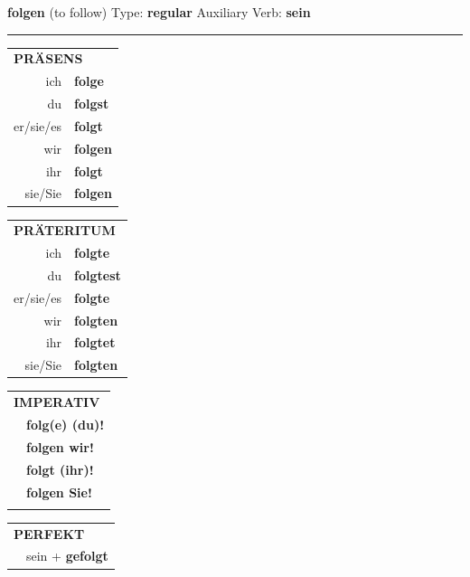 \documentclass[10pt,a4paper]{revtex4-2}
\begin{document}
\begin{verbbox-dat}
    {\Large \bf folgen} (to follow) \hfill Type: \textbf{regular} \hfill Auxiliary Verb: \textbf{sein} 
    
     \vspace{5pt}

    \hrule
    
    \vspace{5pt}

  \begin{tabular}{rl}
     \multicolumn{2}{l}{\textbf{PRÄSENS} }\\
    ich & \textbf{folge}\\
    du & \textbf{folgst}\\
    er/sie/es & \textbf{folgt}\\
    wir & \textbf{folgen}\\
    ihr & \textbf{folgt}\\
    sie/Sie & \textbf{folgen}\\
  \end{tabular}
  \hfill
     \begin{tabular}{rl}
    \multicolumn{2}{l}{\textbf{PRÄTERITUM} }\\
    ich & \textbf{folgte}\\
    du & \textbf{folgtest}\\
    er/sie/es & \textbf{folgte}\\
    wir & \textbf{folgten}\\
    ihr & \textbf{folgtet}\\
    sie/Sie & \textbf{folgten}\\
  \end{tabular}
  \hfill
  \begin{tabular}{rl}
     \multicolumn{2}{l}{\textbf{IMPERATIV} }\\
   & \textbf{folg(e) (du)!}\\
   & \textbf{folgen wir!}\\
   & \textbf{folgt (ihr)!}\\
   & \textbf{folgen Sie!}\\
   & \vspace{10pt}
  \end{tabular}

    \vspace{10pt}

 \begin{tabular}{rl}
     \multicolumn{2}{l}{\textbf{PERFEKT}}\\
   & sein + \textbf{gefolgt}\\
  \end{tabular}
\hfill
   \begin{tabular}{rl}
   

\end{tabular}
\end{verbbox-dat}
\end{document}
